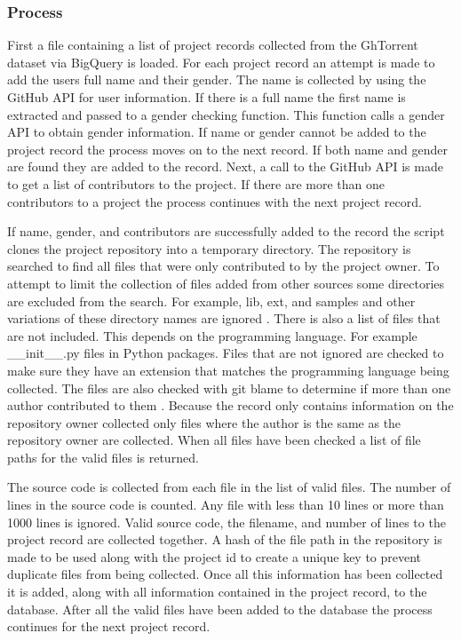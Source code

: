 \documentclass{article}
\begin{document}
\subsubsection*{Process}
First a file containing a list of project records collected from the GhTorrent dataset via BigQuery is loaded. For each project record an attempt is made to add the users full name and their gender. The name is collected by using the GitHub API for user information. If there is a full name the first name is extracted and passed to a gender checking function. This function calls a gender API to obtain gender information. If name or gender cannot be added to the project record the process moves on to the next record. If both name and gender are found they are added to the record. Next, a call to the GitHub API is made to get a list of contributors to the project. If there are more than one contributors to a project the process continues with the next project record.

If name, gender, and contributors are successfully added to the record the script clones the project repository into a temporary directory. The repository is searched to find all files that were only contributed to by the project owner. To attempt to limit the collection of files added from other sources some directories are excluded from the search. For example, lib, ext, and samples and other variations of these directory names are ignored \cite{Matyukhina2019}. There is also a list of files that are not included. This depends on the programming language. For example {\_\_}init{\_\_}.py files in Python packages. Files that are not ignored are checked to make sure they have an extension that matches the programming language being collected. The files are also checked with git blame to determine if more than one author contributed to them \cite{Wisse2015}. Because the record only contains information on the repository owner collected only files where the author is the same as the repository owner are collected. When all files have been checked a list of file paths for the valid files is returned.

The source code is collected from each file in the list of valid files. The number of lines in the source code is counted. Any file with less than 10 lines or more than 1000 lines is ignored. Valid source code, the filename, and number of lines to the project record are collected together. A hash of the file path in the repository is made to be used along with the project id to create a unique key to prevent duplicate files from being collected. Once all this information has been collected it is added, along with all information contained in the project record, to the database. After all the valid files have been added to the database the process continues for the next project record.
\end{document}
